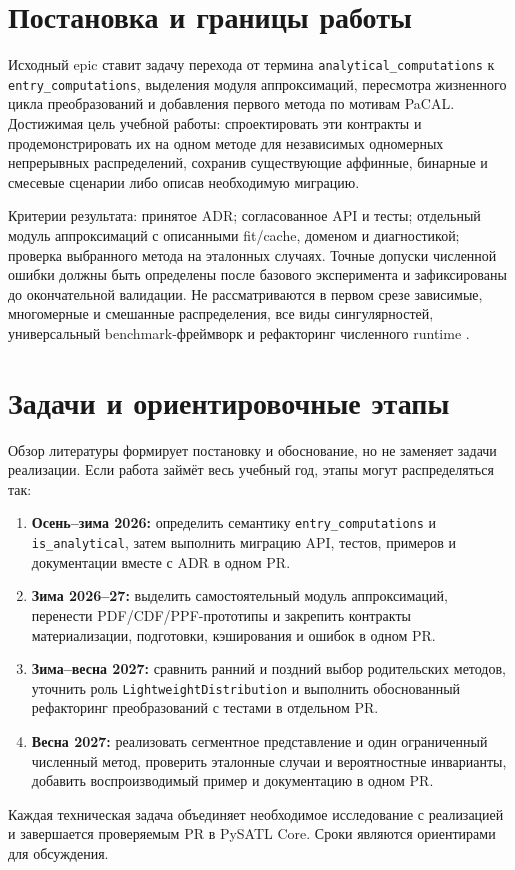 \documentclass[12pt,a4paper]{article}
\begin{document}
\section{Постановка и границы работы}
Исходный epic \cite{epic} ставит задачу перехода от термина \texttt{analytical\_computations} к \texttt{entry\_computations}, выделения модуля аппроксимаций, пересмотра жизненного цикла преобразований и добавления первого метода по мотивам PaCAL. Достижимая цель учебной работы: спроектировать эти контракты и продемонстрировать их на одном методе для независимых одномерных непрерывных распределений, сохранив существующие аффинные, бинарные и смесевые сценарии либо описав необходимую миграцию.

Критерии результата: принятое ADR; согласованное API и тесты; отдельный модуль аппроксимаций с описанными fit/cache, доменом и диагностикой; проверка выбранного метода на эталонных случаях. Точные допуски численной ошибки должны быть определены после базового эксперимента и зафиксированы до окончательной валидации. Не рассматриваются в первом срезе зависимые, многомерные и смешанные распределения, все виды сингулярностей, универсальный benchmark-фреймворк \cite{benchissue} и рефакторинг численного runtime \cite{runtimeissue}.

\section{Задачи и ориентировочные этапы}
Обзор литературы формирует постановку и обоснование, но не заменяет задачи реализации. Если работа займёт весь учебный год, этапы могут распределяться так:
\begin{enumerate}[leftmargin=*]
  \item \textbf{Осень--зима 2026:} определить семантику \texttt{entry\_computations} и \texttt{is\_analytical}, затем выполнить миграцию API, тестов, примеров и документации вместе с ADR в одном PR.
  \item \textbf{Зима 2026--27:} выделить самостоятельный модуль аппроксимаций, перенести PDF/CDF/PPF-прототипы и закрепить контракты материализации, подготовки, кэширования и ошибок в одном PR.
  \item \textbf{Зима--весна 2027:} сравнить ранний и поздний выбор родительских методов, уточнить роль \texttt{LightweightDistribution} и выполнить обоснованный рефакторинг преобразований с тестами в отдельном PR.
  \item \textbf{Весна 2027:} реализовать сегментное представление и один ограниченный численный метод, проверить эталонные случаи и вероятностные инварианты, добавить воспроизводимый пример и документацию в одном PR.
\end{enumerate}
Каждая техническая задача объединяет необходимое исследование с реализацией и завершается проверяемым PR в PySATL Core. Сроки являются ориентирами для обсуждения.
\end{document}
